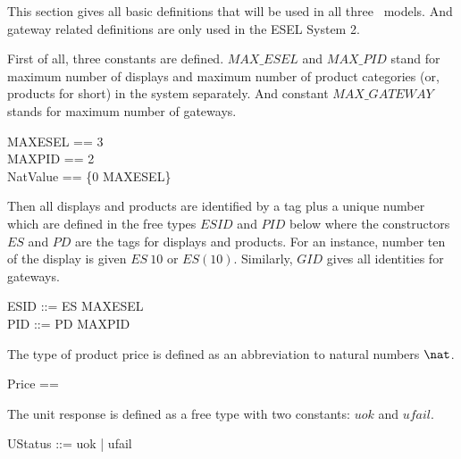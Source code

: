 
This section gives all basic definitions that will be used in all three \Circus\ models. And gateway related definitions are only used in the ESEL System 2.

First of all, three constants are defined. $MAX\_ESEL$ and $MAX\_PID$ stand for maximum number of displays and maximum number of product categories (or, products for short) in the system separately. And constant $MAX\_GATEWAY$ stands for maximum number of gateways.
\begin{zed}
MAXESEL == 3\\
\also MAXPID == 2\\
NatValue == \{0 \upto MAXESEL\}
\end{zed}

Then all displays and products are identified by a tag plus a unique number which are defined in the free types $ESID$ and $PID$ below where the constructors $ES$ and $PD$ are the tags for displays and products. For an instance, number ten of the display is given $ES~10$ or $ES(10)$. Similarly, $GID$ gives all identities for gateways.
\begin{zed}
    ESID ::= ES  \upto MAXESEL \rdata \\
    PID ::= PD  \upto MAXPID \rdata \\
\end{zed}


The type of product price is defined as an abbreviation to natural numbers $\nat$.
\begin{zed}
    Price == \nat
\end{zed}

The unit response is defined as a free type with two constants: $uok$ and $ufail$.
\begin{zed}
    UStatus ::= uok | ufail
\end{zed}

